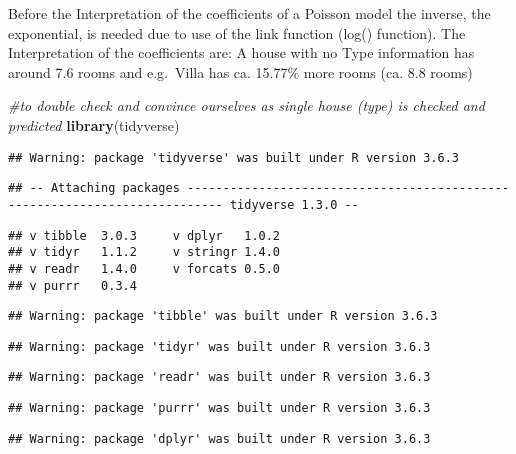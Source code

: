 \documentclass[
]{article}
\newenvironment{Shaded}{\begin{snugshade}}{\end{snugshade}}
\newcommand{\CommentTok}[1]{\textcolor[rgb]{0.56,0.35,0.01}{\textit{#1}}}
\newcommand{\KeywordTok}[1]{\textcolor[rgb]{0.13,0.29,0.53}{\textbf{#1}}}
\newcommand{\NormalTok}[1]{#1}
\begin{document}
Before the Interpretation of the coefficients of a Poisson model the
inverse, the exponential, is needed due to use of the link function
(log() function). The Interpretation of the coefficients are: A house
with no Type information has around 7.6 rooms and e.g.~Villa has ca.
15.77\% more rooms (ca. 8.8 rooms)

\begin{Shaded}
\begin{Highlighting}[]
\CommentTok{#to double check and convince ourselves as single house (type) is checked and predicted}
\KeywordTok{library}\NormalTok{(tidyverse)}
\end{Highlighting}
\end{Shaded}

\begin{verbatim}
## Warning: package 'tidyverse' was built under R version 3.6.3
\end{verbatim}

\begin{verbatim}
## -- Attaching packages --------------------------------------------------------------------------- tidyverse 1.3.0 --
\end{verbatim}

\begin{verbatim}
## v tibble  3.0.3     v dplyr   1.0.2
## v tidyr   1.1.2     v stringr 1.4.0
## v readr   1.4.0     v forcats 0.5.0
## v purrr   0.3.4
\end{verbatim}

\begin{verbatim}
## Warning: package 'tibble' was built under R version 3.6.3
\end{verbatim}

\begin{verbatim}
## Warning: package 'tidyr' was built under R version 3.6.3
\end{verbatim}

\begin{verbatim}
## Warning: package 'readr' was built under R version 3.6.3
\end{verbatim}

\begin{verbatim}
## Warning: package 'purrr' was built under R version 3.6.3
\end{verbatim}

\begin{verbatim}
## Warning: package 'dplyr' was built under R version 3.6.3
\end{verbatim}
\end{document}
